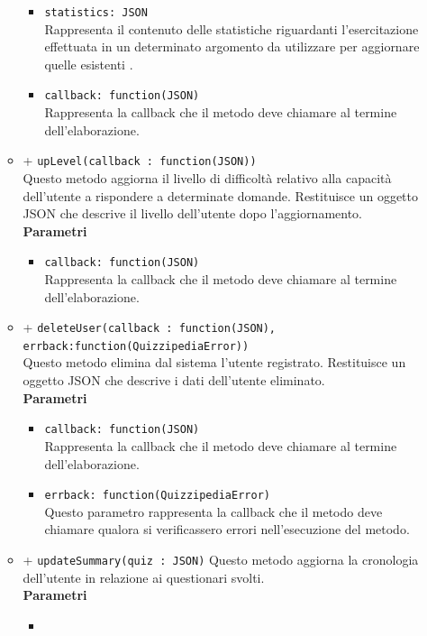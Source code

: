 \begin{itemize}
\begin{itemize}
\begin{itemize}
			\item
				\texttt{statistics: JSON} \\
				Rappresenta il contenuto delle statistiche riguardanti l'esercitazione effettuata in un determinato argomento da utilizzare per aggiornare quelle esistenti .
			\item	
				\texttt{callback: function(JSON)} \\
				Rappresenta la callback che il metodo deve chiamare al termine dell'elaborazione.
			\end{itemize}
		\item		
		+ \texttt{upLevel(callback : function(JSON))} \\
		Questo metodo aggiorna il livello di difficoltà relativo alla capacità dell'utente a rispondere a determinate domande. Restituisce un oggetto JSON che descrive il livello dell'utente dopo l'aggiornamento.	\\	
		\textbf{Parametri} 
			\begin{itemize}
			\item	
				\texttt{callback: function(JSON)} \\
				Rappresenta la callback che il metodo deve chiamare al termine dell'elaborazione.		
			\end{itemize}
		\item		
		+ \texttt{deleteUser(callback : function(JSON), errback:function(QuizzipediaError))} \\	
		Questo metodo elimina dal sistema l'utente registrato. Restituisce un oggetto JSON che descrive i dati dell'utente eliminato.	\\	
		\textbf{Parametri} 
			\begin{itemize}
			\item	
				\texttt{callback: function(JSON)} \\
				Rappresenta la callback che il metodo deve chiamare al termine dell'elaborazione.	
			\item	
				\texttt{errback: function(QuizzipediaError)} \\
				Questo parametro rappresenta la callback che il metodo deve chiamare qualora si verificassero errori nell'esecuzione del metodo.		
			\end{itemize}
		\item	
		+ \texttt{updateSummary(quiz : JSON)}	
		Questo metodo aggiorna la cronologia dell'utente in relazione ai questionari svolti.\\	
		\textbf{Parametri} 
			\begin{itemize}
			\item	

\end{itemize}
\end{itemize}
\end{itemize}
